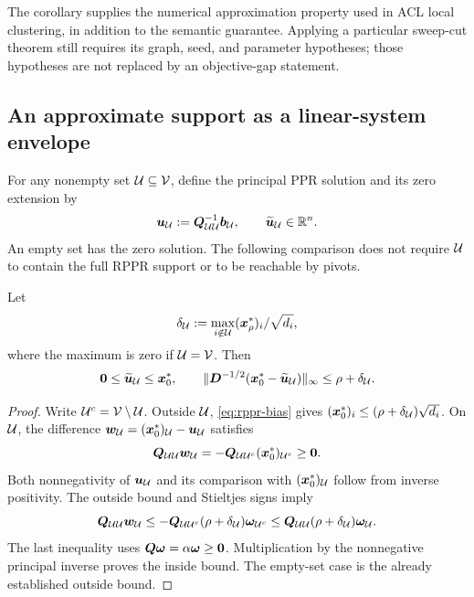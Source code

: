 The corollary supplies the numerical approximation property used in ACL
local clustering, in addition to the semantic guarantee. Applying a
particular sweep-cut theorem still requires its graph, seed, and parameter
hypotheses; those hypotheses are not replaced by an objective-gap statement.

\subsection{An approximate support as a linear-system envelope}

For any nonempty set $\mathcal{U}\subseteq\mathcal{V}$, define the principal PPR solution
and its zero extension by
\begin{equation*}
 \bm{u}_{\mathcal{U}}:=\bm{Q}_{\mathcal{U}\mathcal{U}}^{-1}\bm{b}_{\mathcal{U}},
 \qquad \widetilde{\bm{u}}_{\mathcal{U}}\in\mathbb{R}^n.
\end{equation*}
An empty set has the zero solution. The following comparison does not
require $\mathcal{U}$ to contain the full RPPR support or to be reachable by pivots.

\begin{lemma}
\label{lem:approximate-envelope}
Let
\begin{equation*}
 \delta_{\mathcal{U}}:=\max_{i\notin \mathcal{U}}(\bm{x}_\rho^*)_i/\sqrt{d_i},
\end{equation*}
where the maximum is zero if $\mathcal{U}=\mathcal{V}$. Then
\begin{equation*}
 \bm{0}\leq\widetilde{\bm{u}}_{\mathcal{U}}\leq\bm{x}_0^*,\qquad
 \lVert\bm{D}^{-1/2}(\bm{x}_0^*-\widetilde{\bm{u}}_{\mathcal{U}})\rVert_\infty
       \leq\rho+\delta_{\mathcal{U}}.
\end{equation*}
\end{lemma}
\begin{proof}
Write $\mathcal{U}^c=\mathcal{V}\setminus\mathcal{U}$.
Outside $\mathcal{U}$, \cref{eq:rppr-bias} gives
$(\bm{x}_0^*)_i\leq(\rho+\delta_{\mathcal{U}})\sqrt{d_i}$.
On $\mathcal{U}$, the difference
$\bm{w}_{\mathcal{U}}=(\bm{x}_0^*)_{\mathcal{U}}-\bm{u}_{\mathcal{U}}$ satisfies
\[
 \bm{Q}_{\mathcal{U}\mathcal{U}}\bm{w}_{\mathcal{U}}=-\bm{Q}_{\mathcal{U}\mathcal{U}^c}(\bm{x}_0^*)_{\mathcal{U}^c}\geq\bm{0}.
\]
Both nonnegativity of $\bm{u}_{\mathcal{U}}$ and its comparison with $(\bm{x}_0^*)_{\mathcal{U}}$
follow from inverse positivity. The outside bound and Stieltjes signs imply
\[
 \bm{Q}_{\mathcal{U}\mathcal{U}}\bm{w}_{\mathcal{U}}
 \leq-\bm{Q}_{\mathcal{U}\mathcal{U}^c}(\rho+\delta_{\mathcal{U}})\bm{\omega}_{\mathcal{U}^c}
 \leq\bm{Q}_{\mathcal{U}\mathcal{U}}(\rho+\delta_{\mathcal{U}})\bm{\omega}_{\mathcal{U}}.
\]
The last inequality uses $\bm{Q}\bm{\omega}=\alpha\bm{\omega}\geq\bm{0}$.
Multiplication by the nonnegative principal inverse proves the inside
bound. The empty-set case is the already established outside bound.
\end{proof}

